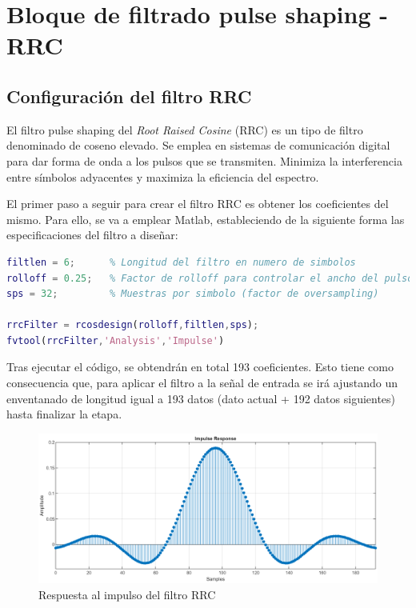 \clearpage

\section{Bloque de filtrado pulse shaping - RRC}

\subsection{Configuración del filtro RRC}

El filtro pulse shaping del \textit{Root Raised Cosine} (RRC) es un tipo de filtro denominado de coseno elevado. Se emplea en sistemas de comunicación digital para dar forma de onda a los pulsos que se transmiten. Minimiza la interferencia entre símbolos adyacentes y maximiza la eficiencia del espectro.

\vspace{3mm}

El primer paso a seguir para crear el filtro RRC es obtener los coeficientes del mismo. Para ello, se va a emplear Matlab, estableciendo de la siguiente forma las especificaciones del filtro a diseñar:

\vspace{5mm}

\begin{lstlisting}[language=matlab, style=mystyle, caption={Diseño del filtro RRC en Matlab}]
filtlen = 6;      % Longitud del filtro en numero de simbolos
rolloff = 0.25;   % Factor de rolloff para controlar el ancho del pulso
sps = 32;         % Muestras por simbolo (factor de oversampling)

rrcFilter = rcosdesign(rolloff,filtlen,sps);
fvtool(rrcFilter,'Analysis','Impulse')
\end{lstlisting}

\vspace{3mm}

Tras ejecutar el código, se obtendrán en total 193 coeficientes. Esto tiene como consecuencia que, para aplicar el filtro a la señal de entrada se irá ajustando un enventanado de longitud igual a 193 datos (dato actual + 192 datos siguientes) hasta finalizar la etapa. 

\vspace{3mm}

\begin{figure}[h]
	\centering
	\includegraphics[width=1\textwidth]{img/matlab/rrc.PNG}
	\caption{Respuesta al impulso del filtro RRC}
	\label{fig:fvtool}
\end{figure}
    
